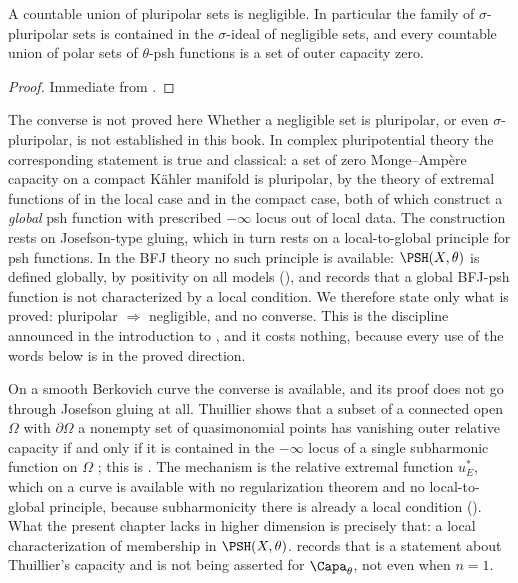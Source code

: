\begin{corollary}
\label{cor:ch25-polar-countable}
A countable union of pluripolar sets is negligible.  In particular the
family of \(\sigma\)-pluripolar sets is contained in the
\(\sigma\)-ideal of negligible sets, and every countable union of polar sets
of \(\theta\)-psh functions is a set of outer capacity zero.
\end{corollary}

\begin{proof}
Immediate from .
\end{proof}

\begin{warning}{The converse is not proved here}
Whether a negligible set is pluripolar, or even
\(\sigma\)-pluripolar, is not established in this book.  In complex
pluripotential theory the corresponding statement is true and classical: a
set of zero Monge--Amp\`ere capacity on a compact K\"ahler manifold is
pluripolar, by the theory of extremal functions of \cite{BT82} in the local
case and \cite{GZ05} in the compact case, both of which construct a
\emph{global} psh function with prescribed \(-\infty\) locus out of local
data.  The construction rests on Josefson-type gluing, which in turn rests on
a local-to-global principle for psh functions.  In the BFJ theory no such
principle is available: \(\PSH(X,\theta)\) is defined globally, by
positivity on all models (), and
 records that a global BFJ-psh function is not
characterized by a local condition.  We therefore state only what is proved:
pluripolar \(\Rightarrow\) negligible, and no converse.  This is the
discipline announced in the introduction to , and it costs
nothing, because every use of the words below is in the proved direction.
\end{warning}

\begin{remark}
\label{rem:ch25-curve-converse}
On a smooth Berkovich curve the converse is available, and its proof does
not go through Josefson gluing at all.  Thuillier shows that a subset of a
connected open \(\Omega\) with \(\partial\Omega\) a nonempty set of
quasimonomial points has vanishing outer relative capacity if and only if it
is contained in the \(-\infty\) locus of a single subharmonic function on
\(\Omega\) \cite[Th\'eor\`eme~3.6.11]{Thu05}; this is
.  The mechanism is the relative extremal
function \(u^*_E\), which on a curve is available with no regularization
theorem and no local-to-global principle, because subharmonicity there is
already a local condition ().  What the
present chapter lacks in higher dimension is precisely that: a local
characterization of membership in \(\PSH(X,\theta)\).
 records that
 is a statement about Thuillier's capacity
and is not being asserted for \(\Capa_\theta\), not even when \(n=1\).
\end{remark}

